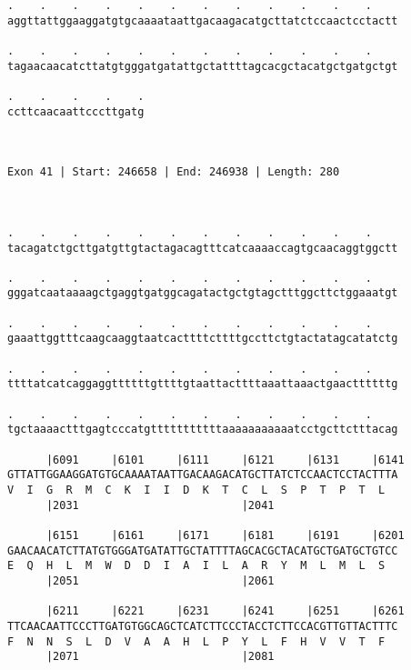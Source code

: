 \documentclass{article}
\begin{document}
\begin{Verbatim}
.    .    .    .    .    .    .    .    .    .    .    .    
aggttattggaaggatgtgcaaaataattgacaagacatgcttatctccaactcctactt
                                                            
.    .    .    .    .    .    .    .    .    .    .    .    
tagaacaacatcttatgtgggatgatattgctattttagcacgctacatgctgatgctgt
                                                            
.    .    .    .    .
ccttcaacaattcccttgatg
                     
                     
 
Exon 41 | Start: 246658 | End: 246938 | Length: 280



.    .    .    .    .    .    .    .    .    .    .    .    
tacagatctgcttgatgttgtactagacagtttcatcaaaaccagtgcaacaggtggctt
                                                            
.    .    .    .    .    .    .    .    .    .    .    .    
gggatcaataaaagctgaggtgatggcagatactgctgtagctttggcttctggaaatgt
                                                            
.    .    .    .    .    .    .    .    .    .    .    .    
gaaattggtttcaagcaaggtaatcacttttcttttgccttctgtactatagcatatctg
                                                            
.    .    .    .    .    .    .    .    .    .    .    .    
ttttatcatcaggaggttttttgttttgtaattacttttaaattaaactgaacttttttg
                                                            
.    .    .    .    .    .    .    .    .    .    .    .    
tgctaaaactttgagtcccatgtttttttttttaaaaaaaaaaatcctgcttctttacag
                                                            
      |6091     |6101     |6111     |6121     |6131     |6141
GTTATTGGAAGGATGTGCAAAATAATTGACAAGACATGCTTATCTCCAACTCCTACTTTA
V  I  G  R  M  C  K  I  I  D  K  T  C  L  S  P  T  P  T  L  
      |2031                         |2041                   
  
      |6151     |6161     |6171     |6181     |6191     |6201
GAACAACATCTTATGTGGGATGATATTGCTATTTTAGCACGCTACATGCTGATGCTGTCC
E  Q  H  L  M  W  D  D  I  A  I  L  A  R  Y  M  L  M  L  S  
      |2051                         |2061                   
  
      |6211     |6221     |6231     |6241     |6251     |6261
TTCAACAATTCCCTTGATGTGGCAGCTCATCTTCCCTACCTCTTCCACGTTGTTACTTTC
F  N  N  S  L  D  V  A  A  H  L  P  Y  L  F  H  V  V  T  F  
      |2071                         |2081                   
  

\end{Verbatim}
\end{document}
